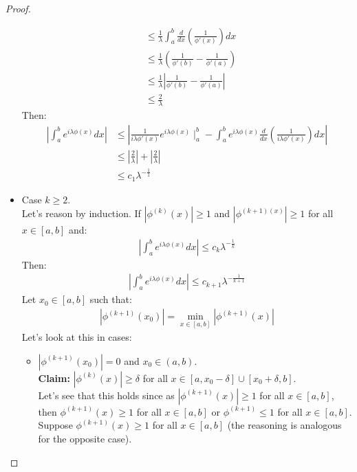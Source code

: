 \begin{proof}{}
\begin{itemize}
\begin{align*}
        &\leq \frac{1}{\lambda}\int_{a}^{b}\frac{d}{dx}\left(\frac{1}{\phi'(x)}\right)dx\\
        &\leq \frac{1}{\lambda}\left(\frac{1}{\phi'(b)}-\frac{1}{\phi'(a)}\right)\\
        &\leq \frac{1}{\lambda}\left|\frac{1}{\phi'(b)}-\frac{1}{\phi'(a)}\right|\\
        &\leq \frac{2}{\lambda}
      \end{align*}
      Then:
      \begin{align*}
        \left| \int_{a}^{b} e^{i\lambda\phi(x)}dx\right|&\leq \left| \frac{1}{i\lambda\phi'(x)}e^{i\lambda\phi(x)}\mid_{a}^{b}-\int_{a}^{b}e^{i\lambda\phi(x)}\frac{d}{dx}\left(\frac{1}{i\lambda\phi'(x)}\right)dx\right|\\
        &\leq \left|\frac{2}{\lambda}\right|+\left|\frac{2}{\lambda}\right|\\
        &\leq c_1\lambda^{-\frac{1}{1}}
      \end{align*}
    \item Case $k\geq 2$.\\
      Let's reason by induction. If $|\phi^{(k)}(x)|\geq 1$ and $|\phi^{(k+1)(x)}|\geq 1$ for all $x\in[a,b]$ and:
      \begin{align*}
        \left|\int_{a}^{b}e^{i\lambda\phi(x)}dx\right|\leq c_k\lambda^{-\frac{1}{k}}
      \end{align*}
      Then:
      \begin{align*}
        \left|\int_{a}^{b}e^{i\lambda\phi(x)}dx\right|\leq c_{k+1}\lambda^{-\frac{1}{k+1}}
      \end{align*}
      Let $x_0\in[a,b]$ such that:
      \begin{align*}
        |\phi^{(k+1)}(x_0)|=\min_{x\in[a,b]}|\phi^{(k+1)}(x)|
      \end{align*}
      Let's look at this in cases:
      \begin{itemize}
        \item $|\phi^{(k+1)}(x_0)|=0$ and $x_0\in(a,b)$.\\
          \textbf{Claim:} $|\phi^{(k)}(x)|\geq \delta$ for all $x\in[a,x_0-\delta]\cup[x_0+\delta,b]$.\\
          Let's see that this holds since as $|\phi^{(k+1)}(x)|\geq 1$ for all $x\in[a,b]$, then $\phi^{(k+1)}(x) \geq 1$ for all $x\in[a,b]$ or $\phi^{(k+1)} \leq 1$ for all $x\in[a,b]$.\\
          Suppose $\phi^{(k+1)}(x)\geq 1$ for all $x\in[a,b]$ (the reasoning is analogous for the opposite case).\\

\end{itemize}
\end{itemize}
\end{proof}
